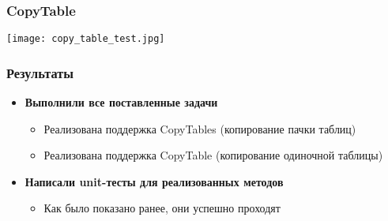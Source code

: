 \begin{frame}\frametitle{CopyTable}
    \texttt{[image: copy\_table\_test.jpg]}
\end{frame}

\begin{frame}\frametitle{Результаты}
    \begin{itemize}
        \item \textbf{Выполнили все поставленные задачи}
            \begin{itemize}
                \item Реализована поддержка CopyTables (копирование пачки таблиц)
                \item Реализована поддержка CopyTable (копирование одиночной таблицы)
            \end{itemize}
        \item \textbf{Написали unit-тесты для реализованных методов}
            \begin{itemize}
                \item Как было показано ранее, они успешно проходят
            \end{itemize}
    \end{itemize}
\end{frame}
